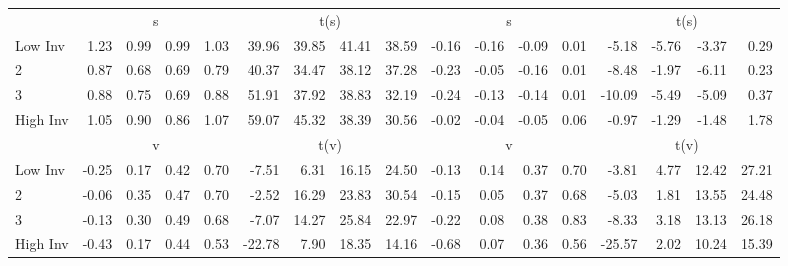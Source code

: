 \begin{table}[!ht]
\begin{tabular}{lrrrrrrrrrrrrrrrr}
  
    
      & \multicolumn{4}{c}{s} & \multicolumn{4}{c}{t(s)}
    
      & \multicolumn{4}{c}{s} & \multicolumn{4}{c}{t(s)}
    
    \\
      \cmidrule(r){2-5} \cmidrule(r){6-9} \cmidrule(r){10-13} \cmidrule(r){14-17}

    Low Inv   & 1.23  & 0.99  & 0.99  & 1.03  & 39.96  & 39.85  & 41.41  & 38.59  & -0.16  & -0.16  & -0.09  & 0.01  & -5.18  & -5.76  & -3.37  & 0.29  \\
           2  & 0.87  & 0.68  & 0.69  & 0.79  & 40.37  & 34.47  & 38.12  & 37.28  & -0.23  & -0.05  & -0.16  & 0.01  & -8.48  & -1.97  & -6.11  & 0.23  \\
           3  & 0.88  & 0.75  & 0.69  & 0.88  & 51.91  & 37.92  & 38.83  & 32.19  & -0.24  & -0.13  & -0.14  & 0.01  & -10.09  & -5.49  & -5.09  & 0.37  \\
    High Inv  & 1.05  & 0.90  & 0.86  & 1.07  & 59.07  & 45.32  & 38.39  & 30.56  & -0.02  & -0.04  & -0.05  & 0.06  & -0.97  & -1.29  & -1.48  & 1.78  \\

  
    
      & \multicolumn{4}{c}{v} & \multicolumn{4}{c}{t(v)}
    
      & \multicolumn{4}{c}{v} & \multicolumn{4}{c}{t(v)}
    
    \\
      \cmidrule(r){2-5} \cmidrule(r){6-9} \cmidrule(r){10-13} \cmidrule(r){14-17}

    Low Inv   & -0.25  & 0.17  & 0.42  & 0.70  & -7.51  & 6.31  & 16.15  & 24.50  & -0.13  & 0.14  & 0.37  & 0.70  & -3.81  & 4.77  & 12.42  & 27.21  \\
           2  & -0.06  & 0.35  & 0.47  & 0.70  & -2.52  & 16.29  & 23.83  & 30.54  & -0.15  & 0.05  & 0.37  & 0.68  & -5.03  & 1.81  & 13.55  & 24.48  \\
           3  & -0.13  & 0.30  & 0.49  & 0.68  & -7.07  & 14.27  & 25.84  & 22.97  & -0.22  & 0.08  & 0.38  & 0.83  & -8.33  & 3.18  & 13.13  & 26.18  \\
    High Inv  & -0.43  & 0.17  & 0.44  & 0.53  & -22.78  & 7.90  & 18.35  & 14.16  & -0.68  & 0.07  & 0.36  & 0.56  & -25.57  & 2.02  & 10.24  & 15.39  \\

  

  \bottomrule
\end{tabular}
\label{tbl:32_Size_BM_Inv_FF1993}
\end{table}